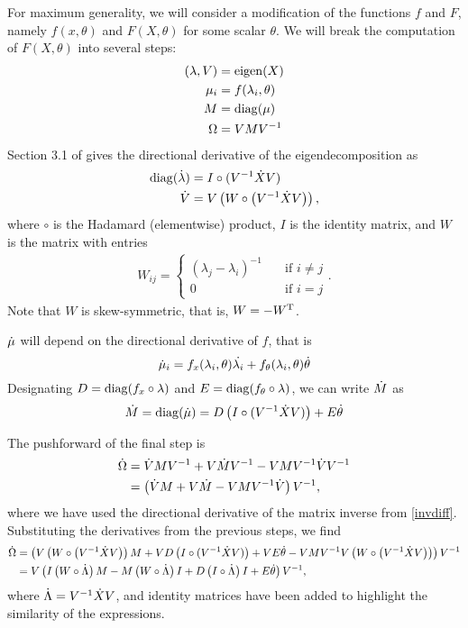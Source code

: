 \documentclass[../main.tex]{subfiles}
\begin{document}
\begin{refsection}
For maximum generality, we will consider a modification of the functions $f$ and $F$, namely $f(x, \theta)$ and $F(X, \theta)$ for some scalar $\theta$.
We will break the computation of $F(X, \theta)$ into several steps:
\begin{align*}
(\lambda, V) &= \operatorname{eigen}(X)\\
\mu_i &= f(\lambda_i, \theta)\\
M &= \operatorname{diag}(\mu)\\
\Omega &= V M V^{-1}\\
\end{align*}
Section 3.1 of \cite{giles_extended_2008} gives the directional derivative of the eigendecomposition as
\begin{align*}
\operatorname{diag}(\dot{\lambda}) &= I \circ (V^{-1} \dot{X} V)\\
\dot{V} &= V \left(W \circ \left(V^{-1} \dot{X} V \right) \right),
\end{align*}
where $\circ$ is the Hadamard (elementwise) product, $I$ is the identity matrix, and $W$ is the matrix with entries
\begin{align*}
W_{ij} = \begin{cases}
(\lambda_j - \lambda_i)^{-1} \quad &\text{if } i \ne j\\
0 \quad &\text{if } i = j
\end{cases}.
\end{align*}
Note that $W$ is skew-symmetric, that is, $W = -{W}^\mathrm{T}$.

$\dot{\mu}$ will depend on the directional derivative of $f$, that is
\[\dot{\mu}_i = f_x(\lambda_i, \theta) \dot{\lambda_i} + f_\theta(\lambda_i, \theta) \dot{\theta}\]
Designating $D = \operatorname{diag}(f_x \circ \lambda)$ and $E = \operatorname{diag}(f_\theta \circ \lambda)$, we can write $\dot{M}$ as
\[\dot{M} = \operatorname{diag}(\dot{\mu}) = D \left(I \circ (V^{-1} \dot{X} V)\right) + E \dot{\theta}\]

The pushforward of the final step is
\begin{align*}
\dot{\Omega}
  &= \dot{V} M V^{-1} + V \dot{M} V^{-1} - V M V^{-1} \dot{V} V^{-1}\\
  &= \left( \dot{V} M + V \dot{M} - V M V^{-1} \dot{V} \right) V^{-1},
\end{align*}
where we have used the directional derivative of the matrix inverse from \eqref{invdiff}.
Substituting the derivatives from the previous steps, we find
\begin{align*}
\dot{\Omega}
  &= \left( V \left(W \circ \left(V^{-1} \dot{X} V \right) \right) M +
            V D \left(I \circ (V^{-1} \dot{X} V)\right) + V E \dot{\theta} -
            V M V^{-1} V \left(W \circ \left(V^{-1} \dot{X} V \right) \right)
     \right) V^{-1}\\
  &= V \left(I \left(W \circ \dot{\Lambda} \right) M -
             M \left(W \circ \dot{\Lambda} \right) I +
             D \left(I \circ \dot{\Lambda} \right) I +
             E \dot{\theta}
     \right) V^{-1},
\end{align*}
where $\dot{\Lambda} = V^{-1} \dot{X} V$, and identity matrices have been added to highlight the similarity of the expressions.


\end{refsection}
\end{document}
